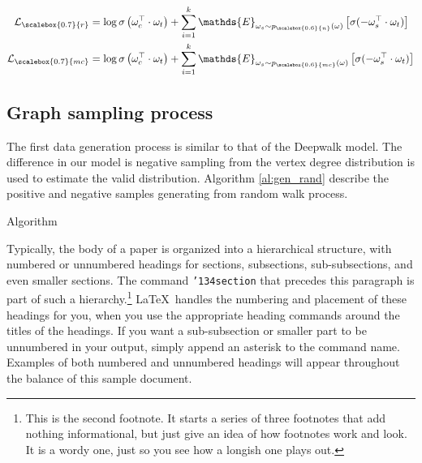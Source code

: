 \documentclass{sig-alternate-05-2015}
\begin{document}
\begin{equation} \label{eq:loss_each}
  \begin{aligned}
    \mathcal{L}_{\scalebox{0.7}{r}} & = \log \sigma \left(\omega^\top_c \cdot \omega_t\right) + 
      \sum^{k}_{i=1} \mathds{E}_{\omega_s \sim p_{\scalebox{0.6}{n}}(\omega)} \left[\sigma (-\omega^\top_s \cdot \omega_t)\right] \\
    \mathcal{L}_{\scalebox{0.7}{mc}} & = \log \sigma \left(\omega^\top_c \cdot \omega_t\right) + 
      \sum^{k}_{i=1} \mathds{E}_{\omega_s \sim p_{\scalebox{0.6}{mc}}(\omega)} \left[\sigma (-\omega^\top_s \cdot \omega_t)\right] \\
  \end{aligned}
\end{equation}

\subsection{Graph sampling process}

The first data generation process is similar to that of
the Deepwalk model. The difference in our model is negative
sampling from the vertex degree distribution is used to
estimate the valid distribution. Algorithm \ref{al:gen_rand}
describe the positive and negative samples generating 
from random walk process.

\begin{algorithm}[h]
  \SetAlgoLined

  \caption{Algorithm}
\end{algorithm}





\begin{definition}

\end{definition}

Typically, the body of a paper is organized
into a hierarchical structure, with numbered or unnumbered
headings for sections, subsections, sub-subsections, and even
smaller sections.  The command \texttt{{\char'134}section} that
precedes this paragraph is part of such a
hierarchy.\footnote{This is the second footnote.  It
starts a series of three footnotes that add nothing
informational, but just give an idea of how footnotes work
and look. It is a wordy one, just so you see
how a longish one plays out.} \LaTeX\ handles the numbering
and placement of these headings for you, when you use
the appropriate heading commands around the titles
of the headings.  If you want a sub-subsection or
smaller part to be unnumbered in your output, simply append an
asterisk to the command name.  Examples of both
numbered and unnumbered headings will appear throughout the
balance of this sample document.
\end{document}
